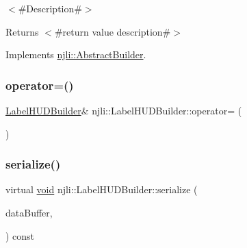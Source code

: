 $<$\#\+Description\#$>$

\begin{DoxyReturn}{Returns}
$<$\#return value description\#$>$ 
\end{DoxyReturn}


Implements \mbox{\hyperlink{classnjli_1_1_abstract_builder_a3e6e553e06d1ca30517ad5fb0bd4d000}{njli\+::\+Abstract\+Builder}}.

\mbox{\label{classnjli_1_1_label_h_u_d_builder_afa9f56518339977a34b3591162634696}} 
\subsubsection{\texorpdfstring{operator=()}{operator=()}}
{\footnotesize\ttfamily \mbox{\hyperlink{classnjli_1_1_label_h_u_d_builder}{Label\+H\+U\+D\+Builder}}\& njli\+::\+Label\+H\+U\+D\+Builder\+::operator= (\begin{DoxyParamCaption}\item[{const \mbox{\hyperlink{classnjli_1_1_label_h_u_d_builder}{Label\+H\+U\+D\+Builder}} \&}]{ }\end{DoxyParamCaption})\hspace{0.3cm}{\ttfamily [protected]}}

\mbox{\label{classnjli_1_1_label_h_u_d_builder_aec96df7406190d4c0d6c9d6cb4f71de4}} 
\subsubsection{\texorpdfstring{serialize()}{serialize()}}
{\footnotesize\ttfamily virtual \mbox{\hyperlink{_thread_8h_af1e856da2e658414cb2456cb6f7ebc66}{void}} njli\+::\+Label\+H\+U\+D\+Builder\+::serialize (\begin{DoxyParamCaption}\item[{\mbox{\hyperlink{_thread_8h_af1e856da2e658414cb2456cb6f7ebc66}{void}} $\ast$}]{data\+Buffer,  }\item[{bt\+Serializer $\ast$}]{ }\end{DoxyParamCaption}) const\hspace{0.3cm}{\ttfamily [virtual]}}



